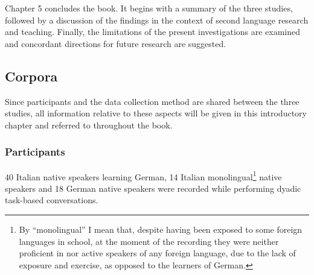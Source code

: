 \begin{styleStandard}
Chapter 5 concludes the book. It begins with a summary of the three studies, followed by a discussion of the findings in the context of second language research and teaching. Finally, the limitations of the present investigations are examined and concordant directions for future research are suggested.
\end{styleStandard}

\subsection{Corpora}
\hypertarget{Toc191305878}{}\begin{styleStandard}
Since participants and the data collection method are shared between the three studies, all information relative to these aspects will be given in this introductory chapter and referred to throughout the book.
\end{styleStandard}

\subsubsection{Participants}
\hypertarget{Toc191305879}{}\begin{styleStandard}
40 Italian native speakers learning German, 14 Italian monolingual\footnote{By “monolingual” I mean that, despite having been exposed to some foreign languages in school, at the moment of the recording they were neither proficient in nor active speakers of any foreign language, due to the lack of exposure and exercise, as opposed to the learners of German.} native speakers and 18 German native speakers were recorded while performing dyadic task-based conversations.
\end{styleStandard}

